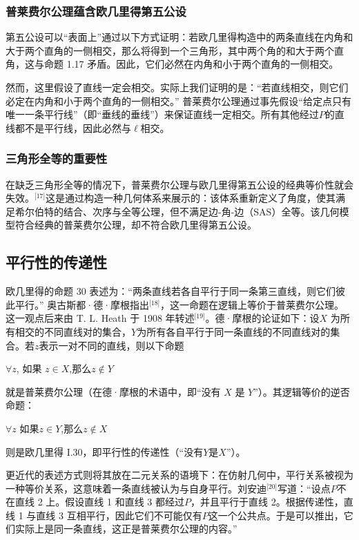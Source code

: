\subsubsection{普莱费尔公理蕴含欧几里得第五公设}
第五公设可以“表面上”通过以下方式证明：若欧几里得构造中的两条直线在内角和大于两个直角的一侧相交，那么将得到一个三角形，其中两个角的和大于两个直角，这与命题 1.17 矛盾。因此，它们必然在内角和小于两个直角的一侧相交。

然而，这里假设了直线一定会相交。实际上我们证明的是：“若直线相交，则它们必定在内角和小于两个直角的一侧相交。” 普莱费尔公理通过事先假设“给定点只有唯一一条平行线”（即“垂线的垂线”）来保证直线一定相交。所有其他经过$P$的直线都不是平行线，因此必然与$\ell$相交。
\subsubsection{三角形全等的重要性}
在缺乏三角形全等的情况下，普莱费尔公理与欧几里得第五公设的经典等价性就会失效。\(^\text{[17]}\)这是通过构造一种几何体系来展示的：该体系重新定义了角度，使其满足希尔伯特的结合、次序与全等公理，但不满足边-角-边（SAS）全等。该几何模型符合经典的普莱费尔公理，却不符合欧几里得第五公设。
\subsection{平行性的传递性}
欧几里得的命题 30 表述为：“两条直线若各自平行于同一条第三直线，则它们彼此平行。” 奥古斯都·德·摩根指出\(^\text{[18]}\)，这一命题在逻辑上等价于普莱费尔公理。这一观点后来由 T. L. Heath 于 1908 年转述\(^\text{[19]}\)。德·摩根的论证如下：设$X$ 为所有相交的不同直线对的集合，$Y$为所有各自平行于同一条直线的不同直线对的集合。若$z$表示一对不同的直线，则以下命题

$\forall z$, 如果 $z \in X$,那么$z \notin Y$~

就是普莱费尔公理（在德·摩根的术语中，即“没有 $X$ 是 $Y$”）。其逻辑等价的逆否命题：

$\forall z$ 如果$z \in Y$,那么$z \notin X$

则是欧几里得 I.30，即平行性的传递性（“没有$Y$是$X$”）。

更近代的表述方式则将其放在二元关系的语境下：在仿射几何中，平行关系被视为一种等价关系，这意味着一条直线被认为与自身平行。刘安迪\(^\text{[20]}\)写道：“设点$P$不在直线 2 上。假设直线 1 和直线 3 都经过$P$，并且平行于直线 2。根据传递性，直线 1 与直线 3 互相平行，因此它们不可能仅有$P$这一个公共点。于是可以推出，它们实际上是同一条直线，这正是普莱费尔公理的内容。”
